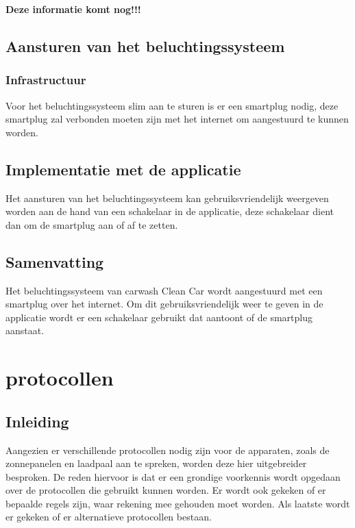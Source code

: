 \textbf{Deze informatie komt nog!!!}

\subsection{Aansturen van het beluchtingssysteem}
\label{sec:stand-van-zaken-beluchtingssysteem-aansturen}

\subsubsection{Infrastructuur}
\label{sec:stand-van-zaken-beluchtingssysteem-infrastructuur}

Voor het beluchtingssysteem slim aan te sturen is er een smartplug nodig, deze smartplug zal verbonden moeten zijn met het internet om aangestuurd te kunnen worden.

\subsection{Implementatie met de applicatie}
\label{sec:stand-van-zaken-beluchtingssysteem-implementatie}

Het aansturen van het beluchtingssysteem kan gebruiksvriendelijk weergeven worden aan de hand van een schakelaar in de applicatie, deze schakelaar dient dan om de smartplug aan of af te zetten.

\subsection{Samenvatting}
\label{sec:stand-van-zaken-beluchtingssysteem-samenvatting}

Het beluchtingssysteem van carwash Clean Car wordt aangestuurd met een smartplug over het internet. Om dit gebruiksvriendelijk weer te geven in de applicatie wordt er een schakelaar gebruikt dat aantoont of de smartplug aanstaat.

\section{protocollen}
\label{sec:stand-van-zaken-protocollen}

\subsection{Inleiding}
\label{sec:stand-van-zaken-protocollen-inleiding}

Aangezien er verschillende protocollen nodig zijn voor de apparaten, zoals de zonnepanelen en laadpaal aan te spreken, worden deze hier uitgebreider besproken. De reden hiervoor is dat er een grondige voorkennis wordt opgedaan over de protocollen die gebruikt kunnen worden. Er wordt ook gekeken of er bepaalde regels zijn, waar rekening mee gehouden moet worden. Als laatste wordt er gekeken of er alternatieve protocollen bestaan.

